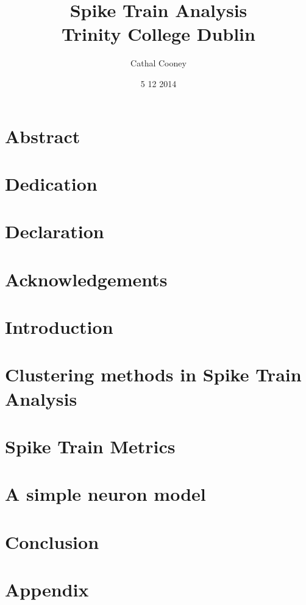 \documentclass[12pt]{report}
\title{
	{Spike Train Analysis} \\
	{\large Trinity College Dublin} \\
}
\author{Cathal Cooney}
\date{5 12 2014}
\begin{document}
\maketitle

\chapter*{Abstract}

\chapter*{Dedication}

\chapter*{Declaration}

\chapter*{Acknowledgements}

\tableofcontents


\chapter{Introduction}


\chapter{Clustering methods in Spike Train Analysis}


\chapter{Spike Train Metrics}


\chapter{A simple neuron model}


\chapter{Conclusion}


\appendix
\chapter{Appendix}

\end{document}
